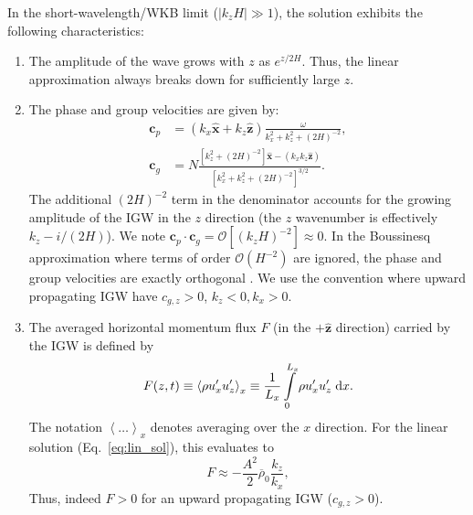 \documentclass[
        fleqn,
        usenatbib,
    ]{mnras}
\newcommand*{\abs}[1]{\left|#1\right|}
\newcommand*{\ev}[1]{\left\langle#1\right\rangle}
\newcommand*{\p}[1]{\left(#1\right)}
\newcommand*{\s}[1]{\left[#1\right]}
\newcommand*{\bm}[1]{\mathbf{#1}}
\newcommand*{\uv}[1]{\hat{\mathbf{#1}}}
\begin{document}
In the short-wavelength/WKB limit ($\abs{k_{z}H} \gg 1$), the solution exhibits
the following characteristics:
\begin{enumerate}
    \item The amplitude of the wave grows with $z$ as $e^{z/2H}$. Thus, the
        linear approximation always breaks down for sufficiently large $z$.

    \item The phase and group velocities are given by:
        \begin{align}
            \bm{c}_{p} &=
                \p{k_{x}\uv{x} + k_{z}\uv{z}}\frac{\omega}
                {k_{x}^2 + k_{z}^2 + \p{2H}^{-2}},\\
            \bm{c}_{g} &= N\frac{\s{k_{z}^2 + \p{2H}^{-2}}\uv{x}
                - \p{k_{x}k_{z}\uv{z}}}
                {\s{k_{x}^2 + k_{z}^2 + \p{2H}^{-2}}^{3/2}}.\label{eq:vg}
        \end{align}
        \textcolor{Corr}{The additional $\p{2H}^{-2}$ term in the denominator
        accounts for the growing amplitude of the IGW in the $z$ direction (the
        $z$ wavenumber is effectively $k_z - i / (2H)$).}
        We note $\bm{c}_{p} \cdot \bm{c}_g = \mathcal{O}\s{\p{k_{z}H}^{-2}}
        \approx 0$. In the Boussinesq approximation where terms of order
        $\mathcal{O}\p{H^{-2}}$ are ignored, the phase and group velocities are
        exactly orthogonal \citep{drazin,sutherland1}. We use the convention
        where upward propagating IGW have $c_{g, z} > 0$, $k_z < 0, k_x > 0$.

    \item The averaged horizontal momentum flux $F$ (in the $+\uv{z}$
        direction) carried by the IGW is defined by
        \begin{equation}
            F(z, t) \equiv \ev{\rho u_{x}' u_{z}'}_x \equiv
                \frac{1}{L_x}\int_0^{L_x}\limits \rho u_{x}'u_{z}'\;\mathrm{d}x.
                    \label{eq:F_def}
        \end{equation}
        The notation $\ev{\dots}_x$ denotes averaging over the $x$ direction.
        For the linear solution (Eq.~\ref{eq:lin_sol}), this evaluates to
        \begin{equation}
            F \approx -\frac{A^2}{2}\overline{\rho}_0\frac{k_{z}}{k_{x}},
                    \label{eq:S_lin}
        \end{equation}
        Thus, indeed $F > 0$ for an upward propagating IGW ($c_{g, z} > 0$).
\end{enumerate}
\end{document}
